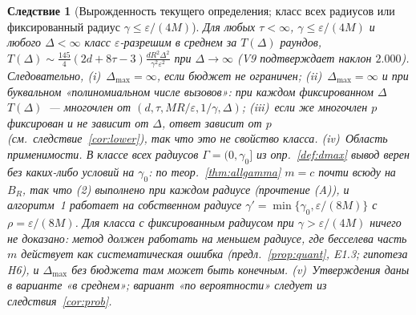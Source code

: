 \documentclass[11pt,a4paper]{article}
\numberwithin{equation}{section}
\newtheorem{corollary}[theorem]{Следствие}
\theoremstyle{definition}
\theoremstyle{remark}
\newcommand{\Dmax}{\Delta_{\max}}\newcommand{\Dcp}{\Delta_{\rm cp}}
\begin{document}
\begin{corollary}[Вырожденность текущего определения; класс всех радиусов или фиксированный радиус $\gamma\le\varepsilon/(4M)$]\label{cor:degenerate}
Для любых $\tau<\infty$, $\gamma\le\varepsilon/(4M)$ и любого $\Delta<\infty$ класс $\varepsilon$-разрешим в среднем за $T(\Delta)$ раундов, $T(\Delta)\sim\frac{145}4(2d+8\tau-3)\frac{dR^2\Delta^2}{\gamma^2\varepsilon^2}$ при $\Delta\to\infty$ (V9 подтверждает наклон $2.000$). Следовательно, (i)~$\Dmax=\infty$, если бюджет не ограничен; (ii)~$\Dmax=\infty$ и при буквальном «полиномиальном числе вызовов»: при каждом фиксированном $\Delta$ $T(\Delta)$~--- многочлен от $(d,\tau,MR/\varepsilon,1/\gamma,\Delta)$; (iii)~если же многочлен $p$ фиксирован и не зависит от $\Delta$, ответ зависит от $p$ (см.\ следствие~\ref{cor:lower}), так что это не свойство класса.
(iv)~\emph{Область применимости.} В классе всех радиусов $\Gamma=(0,\gamma_0]$ из опр.~\ref{def:dmax} вывод верен без каких-либо условий на $\gamma_0$: по теор.~\ref{thm:allgamma} $m=c$ почти всюду на $B_R$, так что (2) выполнено при каждом радиусе (прочтение (A)), и алгоритм~1 работает на собственном радиусе $\gamma'=\min\{\gamma_0,\varepsilon/(8M)\}$ с $\rho=\varepsilon/(8M)$. Для класса с фиксированным радиусом при $\gamma>\varepsilon/(4M)$ \emph{ничего не доказано}: метод должен работать на меньшем радиусе, где бесселева часть $m$ действует как систематическая ошибка (предл.~\ref{prop:quant}, E1.3; гипотеза H6), и $\Dmax$ без бюджета там может быть конечным.
(v)~Утверждения даны в варианте «в среднем»; вариант «по вероятности» следует из следствия~\ref{cor:prob}.
\end{corollary}
\end{document}
